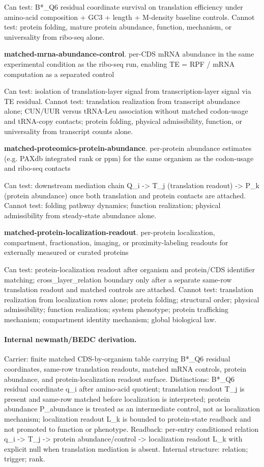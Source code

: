 Can test: B*\_Q6 residual coordinate survival on translation efficiency under amino-acid composition + GC3 + length + M-density baseline controls. Cannot test: protein folding, mature protein abundance, function, mechanism, or universality from ribo-seq alone.

\textbf{matched-mrna-abundance-control}. per-CDS mRNA abundance in the same experimental condition as the ribo-seq run, enabling TE = RPF / mRNA computation as a separated control

Can test: isolation of translation-layer signal from transcription-layer signal via TE residual. Cannot test: translation realization from transcript abundance alone; CUN/UUR versus tRNA-Leu association without matched codon-usage and tRNA-copy contacts; protein folding, physical admissibility, function, or universality from transcript counts alone.

\textbf{matched-proteomics-protein-abundance}. per-protein abundance estimates (e.g. PAXdb integrated rank or ppm) for the same organism as the codon-usage and ribo-seq contacts

Can test: downstream mediation chain Q\_i -> T\_j (translation readout) -> P\_k (protein abundance) once both translation and protein contacts are attached. Cannot test: folding pathway dynamics; function realization; physical admissibility from steady-state abundance alone.

\textbf{matched-protein-localization-readout}. per-protein localization, compartment, fractionation, imaging, or proximity-labeling readouts for externally measured or curated proteins

Can test: protein-localization readout after organism and protein/CDS identifier matching; cross\_layer\_relation boundary only after a separate same-row translation readout and matched controls are attached. Cannot test: translation realization from localization rows alone; protein folding; structural order; physical admissibility; function realization; system phenotype; protein trafficking mechanism; compartment identity mechanism; global biological law.

\paragraph{Internal newmath/BEDC derivation.} Carrier: finite matched CDS-by-organism table carrying B*\_Q6 residual coordinates, same-row translation readouts, matched mRNA controls, protein abundance, and protein-localization readout surface. Distinctions: B*\_Q6 residual coordinate q\_i after amino-acid quotient; translation readout T\_j is present and same-row matched before localization is interpreted; protein abundance P\_abundance is treated as an intermediate control, not as localization mechanism; localization readout L\_k is bounded to protein-state readback and not promoted to function or phenotype. Readback: per-entry conditioned relation q\_i -> T\_j -> protein abundance/control -> localization readout L\_k with explicit null when translation mediation is absent. Internal structure: relation; trigger; rank.

